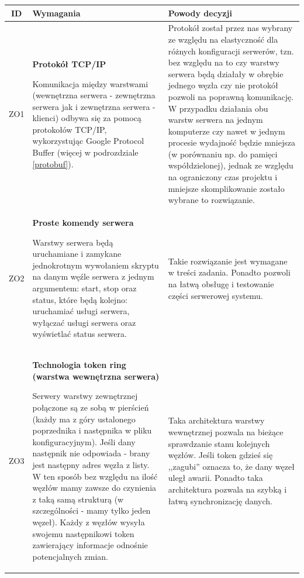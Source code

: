 \begin{tabularx}{\textwidth}{|c|X|X|}
\hline
\textbf{ID} & \textbf{Wymagania}  & \textbf{Powody decyzji} \\
\hline

\label{z:ZO1} ZO1 &  \textbf{Protokół TCP/IP }

Komunikacja między warstwami (wewnętrzna serwera - zewnętrzna serwera jak i zewnętrzna serwera - klienci) odbywa się za pomocą protokołów TCP/IP, wykorzystując Google Protocol Buffer (więcej w podrozdziale \ref{protobuf}). & 
Protokół został przez nas wybrany ze względu na elastyczność dla różnych konfiguracji serwerów, tzn. bez względu na to czy warstwy serwera będą działały w obrębie jednego węzła czy nie protokół pozwoli na poprawną komunikację. W przypadku działania obu warstw serwera na jednym komputerze czy nawet w jednym procesie wydajność będzie mniejsza (w porównaniu np. do pamięci współdzielonej), jednak ze względu na ograniczony czas projektu i mniejsze skomplikowanie zostało wybrane to rozwiązanie. \\
\hline

\label{z:ZO2} ZO2 &  \textbf{Proste komendy serwera}

Warstwy serwera będą uruchamiane i zamykane jednokrotnym wywołaniem skryptu na danym węźle serwera z jednym argumentem: start, stop oraz status, które będą kolejno: uruchamiać usługi serwera, wyłączać usługi serwera oraz wyświetlać status serwera. & 
Takie rozwiązanie jest wymagane w treści zadania. Ponadto pozwoli na łatwą obsługę i testowanie części serwerowej systemu. \\
\hline

\label{z:ZO3} ZO3 &  \textbf{Technologia token ring (warstwa wewnętrzna serwera)}

Serwery warstwy zewnętrznej połączone są ze sobą w pierścień (każdy ma z góry ustalonego poprzednika i następnika w pliku konfiguracyjnym). Jeśli dany następnik nie odpowiada - brany jest następny adres węzła z listy. W ten sposób bez względu na ilość węzłów mamy zawsze do czynienia z taką samą strukturą (w szczególności - mamy tylko jeden węzeł). Każdy z węzłów wysyła swojemu następnikowi token zawierający informacje odnośnie potencjalnych zmian. & 
Taka architektura warstwy wewnętrznej pozwala na bieżące sprawdzanie stanu kolejnych węzłów. Jeśli token gdzieś się ,,zagubi'' oznacza to, że dany węzeł uległ awarii. Ponadto taka architektura pozwala na szybką i łatwą synchronizację danych. \\
\hline

\end{tabularx}

